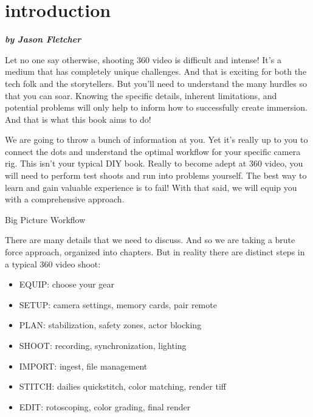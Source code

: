 
\SkipTocEntry\chapter*{introduction}
\addtocounter{section}{2}
\begin{fullwidth}

{\itshape\bfseries by Jason Fletcher

}

Let no one say otherwise, shooting 360 video is difficult and intense! It’s a medium that has completely unique challenges. And that is exciting for both the tech folk and the storytellers. But you’ll need to understand the many hurdles so that you can soar. Knowing the specific details, inherent limitations, and potential problems will only help to inform how to successfully create immersion. And that is what this book aims to do!

We are going to throw a bunch of information at you. Yet it's really up to you to connect the dots and understand the optimal workflow for your specific camera rig. This isn’t your typical DIY book. Really to become adept at 360 video, you will need to perform test shoots and run into problems yourself. The best way to learn and gain valuable experience is to fail! With that said, we will equip you with a comprehensive approach.

{\large Big Picture Workflow\par}

There are many details that we need to discuss. And so we are taking a brute force approach, organized into chapters. But in reality there are distinct steps in a typical 360 video shoot:

\begin{itemize}
\item EQUIP: choose your gear
\item SETUP: camera settings, memory cards, pair remote
\item PLAN: stabilization, safety zones, actor blocking
\item SHOOT: recording, synchronization, lighting
\item IMPORT: ingest, file management 
\item STITCH: dailies quickstitch, color matching, render tiff
\item EDIT: rotoscoping, color grading, final render
\end{itemize}

\clearpage
\end{fullwidth}
